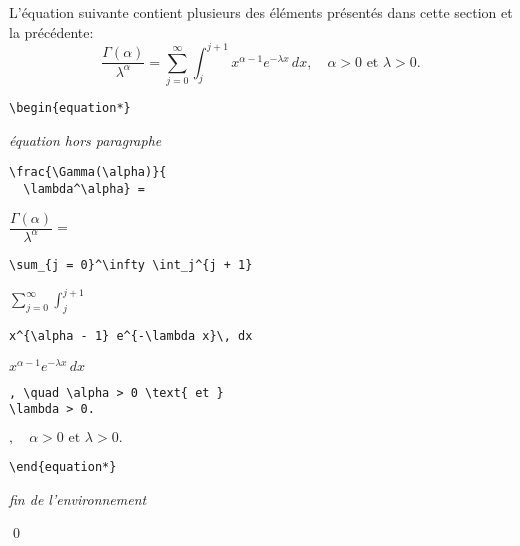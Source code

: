 \begin{exemple}
  L'équation suivante contient plusieurs des éléments présentés dans
  cette section et la précédente:
  \begin{equation*}
    \frac{\Gamma(\alpha)}{\lambda^\alpha} =
    \sum_{j = 0}^\infty \int_j^{j + 1} x^{\alpha - 1} e^{-\lambda x}\,
    dx,
    \quad
    \alpha > 0 \text{ et } \lambda > 0.
  \end{equation*}
  \begin{demo}
    \begin{texample}[0.58\linewidth]
\begin{lstlisting}
\begin{equation*}
\end{lstlisting}
      \producing
      \emph{équation hors paragraphe}
    \end{texample}

    \begin{texample}[0.58\linewidth]
\begin{lstlisting}
\frac{\Gamma(\alpha)}{
  \lambda^\alpha} =
\end{lstlisting}
      \producing
      $\dfrac{\Gamma(\alpha)}{\lambda^\alpha} =$
    \end{texample}

    \begin{texample}[0.58\linewidth]
\begin{lstlisting}
\sum_{j = 0}^\infty \int_j^{j + 1}
\end{lstlisting}
      \producing
      $\displaystyle \sum_{j = 0}^\infty \int_j^{j + 1}$
    \end{texample}

    \begin{texample}[0.58\linewidth]
\begin{lstlisting}
x^{\alpha - 1} e^{-\lambda x}\, dx
\end{lstlisting}
      \producing
      $\displaystyle x^{\alpha - 1} e^{-\lambda x}\, dx$
    \end{texample}

    \begin{texample}[0.58\linewidth]
\begin{lstlisting}
, \quad \alpha > 0 \text{ et }
\lambda > 0.
\end{lstlisting}
      \producing
      $, \quad \alpha > 0 \text{ et } \lambda > 0.$
    \end{texample}

    \begin{texample}[0.58\linewidth]
\begin{lstlisting}
\end{equation*}
\end{lstlisting}
      \producing
      \emph{fin de l'environnement}
    \end{texample}
  \end{demo}
  \qed
\end{exemple}


